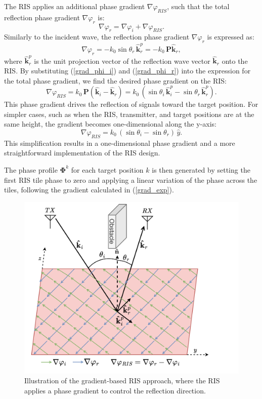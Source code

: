 \documentclass{IEEEoj}
\begin{document}
The RIS applies an additional phase gradient \( \nabla \varphi_{RIS} \), such that the total reflection phase gradient \( \nabla \varphi_r \) is:
\[
\nabla \varphi_r = \nabla \varphi_i + \nabla \varphi_{RIS}.
\]
Similarly to the incident wave, the reflection phase gradient \( \nabla \varphi_r \) is expressed as:
\[
\nabla \varphi_r = - k_0 \sin\theta_r \, \mathbf{\hat{k}}_r^p = - k_0 \, \textbf{P} \mathbf{\hat{k}}_r,
\]
where \( \mathbf{\hat{k}}_r^p \) is the unit projection vector of the reflection wave vector \( \mathbf{\hat{k}}_r \) onto the RIS. By substituting (\ref{grad_phi_i}) and (\ref{grad_phi_r}) into the expression for the total phase gradient, we find the desired phase gradient on the RIS:
\[
\nabla \varphi_{RIS} = k_0 \, \textbf{P} (\mathbf{\hat{k}}_i - \mathbf{\hat{k}}_r) = k_0 \, (\sin\theta_i \, \mathbf{\hat{k}}_i^p - \sin\theta_r \, \mathbf{\hat{k}}_r^p).
\]
This phase gradient drives the reflection of signals toward the target position. For simpler cases, such as when the RIS, transmitter, and target positions are at the same height, the gradient becomes one-dimensional along the y-axis:
\[
\nabla \varphi_{RIS} = k_0 \, (\sin\theta_i - \sin\theta_r) \, \hat{y}.
\]
This simplification results in a one-dimensional phase gradient and a more straightforward implementation of the RIS design.

The phase profile \( \mathbf{\Phi}^k \) for each target position \( k \) is then generated by setting the first RIS tile phase to zero and applying a linear variation of the phase across the tiles, following the gradient calculated in (\ref{grad_exp}).

\begin{figure}
	\centering \includegraphics[width=.87\linewidth]{RIS_Phase_Gradient.png}
	\caption{Illustration of the gradient-based RIS approach, where the RIS applies a phase gradient to control the reflection direction.}
	\label{RIS_Phase_Gradient}
\end{figure}
\end{document}
